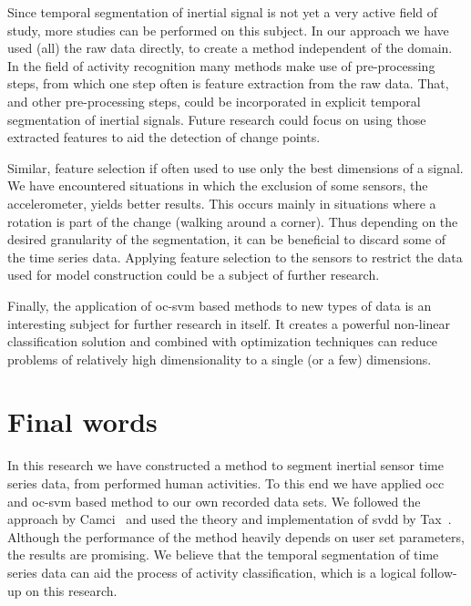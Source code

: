 Since temporal segmentation of inertial signal is not yet a very active field of study, more studies can be performed on this subject.
In our approach we have used (all) the raw data directly, to create a method independent of the domain.
In the field of activity recognition many methods make use of pre-processing steps, from which one step often is feature extraction from the raw data.
That, and other pre-processing steps, could be incorporated in explicit temporal segmentation of inertial signals.
Future research could focus on using those extracted features to aid the detection of change points.

Similar, feature selection if often used to use only the best dimensions of a signal.
We have encountered situations in which the exclusion of some sensors, \eg the accelerometer, yields better results.
This occurs mainly in situations where a rotation is part of the change (\eg walking around a corner).
Thus depending on the desired granularity of the segmentation, it can be beneficial to discard some of the time series data.
Applying feature selection to the sensors to restrict the data used for model construction could be a subject of further research.

Finally, the application of \gls{oc-svm} based methods to new types of data is an interesting subject for further research in itself.
It creates a powerful non-linear classification solution and combined with optimization techniques can reduce problems of relatively high dimensionality to a single (or a few) dimensions.

\section{Final words}\label{sec:final_remarks}
In this research we have constructed a method to segment inertial sensor time series data, from performed human activities.
To this end we have applied \gls{occ} and \gls{oc-svm} based method to our own recorded data sets.
We followed the approach by Camci~\cite{camci2010change} and used the theory and implementation of \gls{svdd} by Tax~\cite{tax2001one,Ddtools2013}.
Although the performance of the method heavily depends on user set parameters, the results are promising.
We believe that the temporal segmentation of time series data can aid the process of activity classification, which is a logical follow-up on this research.
